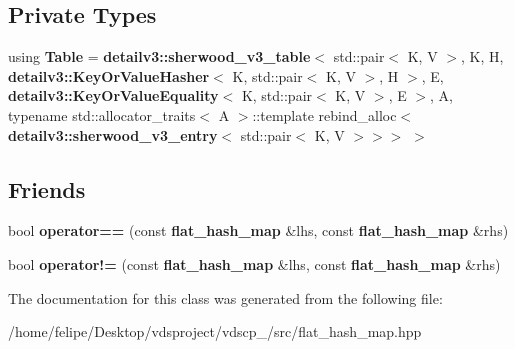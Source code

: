 \subsection*{Private Types}
\begin{DoxyCompactItemize}
\item 
using {\bfseries Table} = {\bf detailv3\+::sherwood\+\_\+v3\+\_\+table}$<$ std\+::pair$<$ K, V $>$, K, H, {\bf detailv3\+::\+Key\+Or\+Value\+Hasher}$<$ K, std\+::pair$<$ K, V $>$, H $>$, E, {\bf detailv3\+::\+Key\+Or\+Value\+Equality}$<$ K, std\+::pair$<$ K, V $>$, E $>$, A, typename std\+::allocator\+\_\+traits$<$ A $>$\+::template rebind\+\_\+alloc$<$ {\bf detailv3\+::sherwood\+\_\+v3\+\_\+entry}$<$ std\+::pair$<$ K, V $>$$>$$>$ $>$\label{classska_1_1flat__hash__map_a6ef9f5f58e71eae864a3cc89d29e0c4b}

\end{DoxyCompactItemize}
\subsection*{Friends}
\begin{DoxyCompactItemize}
\item 
bool {\bfseries operator==} (const {\bf flat\+\_\+hash\+\_\+map} \&lhs, const {\bf flat\+\_\+hash\+\_\+map} \&rhs)\label{classska_1_1flat__hash__map_a469dfb7c5084c0ebd754590f1e78ae87}

\item 
bool {\bfseries operator!=} (const {\bf flat\+\_\+hash\+\_\+map} \&lhs, const {\bf flat\+\_\+hash\+\_\+map} \&rhs)\label{classska_1_1flat__hash__map_a62328dcbb77072758a4f1f68db6f5e2a}

\end{DoxyCompactItemize}


The documentation for this class was generated from the following file\+:\begin{DoxyCompactItemize}
\item 
/home/felipe/\+Desktop/vdsproject/vdscp\+\_/src/flat\+\_\+hash\+\_\+map.\+hpp\end{DoxyCompactItemize}
